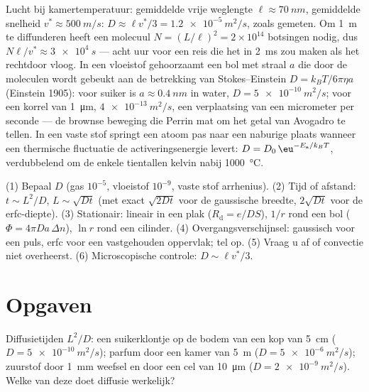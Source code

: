 \begin{example}\label{ex:b2:particle-diffusion:kinetic}
Lucht bij kamertemperatuur: gemiddelde vrije weglengte $\ell \approx \qty{70}{nm}$,
gemiddelde snelheid $v^* \approx \qty{500}{m/s}$:
$D \approx \ell v^*/3 =
\qty{1.2e-5}{m^2/s}$, zoals gemeten. Om \qty{1}{m}
te diffunderen heeft een molecuul
$N = (L/\ell)^2 = 2 \times 10^{14}$ botsingen nodig, dus
$N\ell/v^*
\approx \qty{3e4}{s}$ --- acht uur voor een reis die het in
\qty{2}{ms} zou maken als het rechtdoor vloog. In een vloeistof gehoorzaamt
een bol met straal $a$
die door de moleculen wordt gebeukt aan de betrekking van Stokes--Einstein
$D =
k_BT/6\pi\eta a$ (Einstein 1905): voor suiker is
$a \approx \qty{0.4}{nm}$
in water, $D = \qty{5e-10}{m^2/s}$; voor een korrel van \qty{1}{\micro m},
$\qty{4e-13}{m^2/s}$, een verplaatsing van een micrometer per seconde ---
de brownse beweging die Perrin mat om het getal van Avogadro te tellen. In
een vaste stof springt een atoom pas naar een naburige plaats wanneer een thermische
fluctuatie de activeringsenergie levert: $D = D_0\,\eu^{-E_{\text{a}}/k_BT}$,
verdubbelend om de enkele tientallen kelvin nabij \qty{1000}{\celsius}.
\end{example}

\begin{method}[Diffusieschattingen]\label{meth:b2:particle-diffusion:method}
(1) Bepaal $D$ (gas $10^{-5}$, vloeistof $10^{-9}$, vaste stof arrhenius).
(2) Tijd of afstand: $t \sim L^2/D$, $L \sim \sqrt{Dt}$ (met exact
$\sqrt{2Dt}$ voor de gaussische breedte, $2\sqrt{Dt}$ voor de erfc-diepte).
(3) Stationair: lineair in een plak ($R_{\text{d}} = e/DS$), $1/r$ rond een
bol ($\Phi = 4\pi D a\,\Delta n$), $\ln r$ rond een cilinder. (4)
Overgangsverschijnsel: gaussisch voor een puls, erfc voor een vastgehouden
oppervlak; tel op.
(5) Vraag u af of convectie niet overheerst. (6) Microscopische controle:
$D \sim \ell v^*/3$.
\end{method}

\section{Opgaven}

\begin{exercise}[$\star$]\label{exo:b2:particle-diffusion:1}
Diffusietijden $L^2/D$: een suikerklontje op de bodem van een kop van \qty{5}{cm}
($D = \qty{5e-10}{m^2/s}$); parfum door een kamer van \qty{5}{m}
($D =
\qty{5e-6}{m^2/s}$); zuurstof door \qty{1}{mm} weefsel en door een
cel van \qty{10}{\micro m} ($D = \qty{2e-9}{m^2/s}$). Welke van deze doet
diffusie werkelijk?
\end{exercise}

